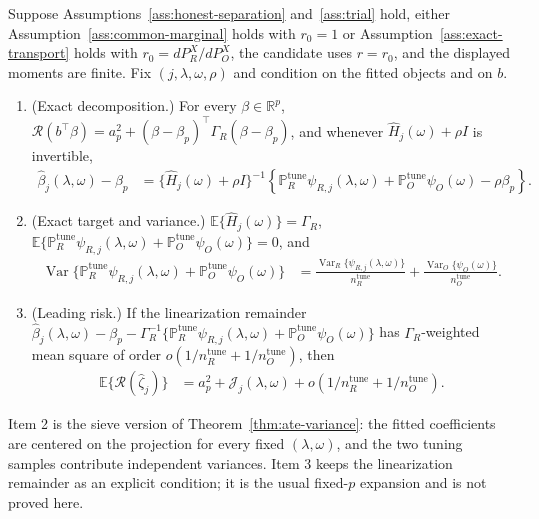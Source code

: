 \begin{theorem}
\label{thm:sieve-risk}
Suppose Assumptions~\ref{ass:honest-separation} and~\ref{ass:trial} hold, either Assumption~\ref{ass:common-marginal} holds with $r_0=1$ or Assumption~\ref{ass:exact-transport} holds with $r_0=dP_R^X/dP_O^X$, the candidate uses $r=r_0$, and the displayed moments are finite. Fix $(j,\lambda,\omega,\rho)$ and condition on the fitted objects and on $b$.
\begin{enumerate}
\item (Exact decomposition.) For every $\beta\in\mathbb R^p$, $\mathcal R(b^\top\beta)=a_p^2+(\beta-\beta_p)^\top\Gamma_R(\beta-\beta_p)$, and whenever $\widehat H_j(\omega)+\rho I$ is invertible,
\begin{align}
\widehat\beta_j(\lambda,\omega)-\beta_p
&=\{\widehat H_j(\omega)+\rho I\}^{-1}\left\{\mathbb P_R^{\mathrm{tune}}\psi_{R,j}(\lambda,\omega)+\mathbb P_O^{\mathrm{tune}}\psi_O(\omega)-\rho\beta_p\right\}.
\label{eq:sieve-coefficient-identity}
\end{align}
\item (Exact target and variance.) $\mathbb E\{\widehat H_j(\omega)\}=\Gamma_R$, $\mathbb E\{\mathbb P_R^{\mathrm{tune}}\psi_{R,j}(\lambda,\omega)+\mathbb P_O^{\mathrm{tune}}\psi_O(\omega)\}=0$, and
\begin{align}
\operatorname{Var}\{\mathbb P_R^{\mathrm{tune}}\psi_{R,j}(\lambda,\omega)+\mathbb P_O^{\mathrm{tune}}\psi_O(\omega)\}
&=\frac{\operatorname{Var}_R\{\psi_{R,j}(\lambda,\omega)\}}{n_R^{\mathrm{tune}}}+\frac{\operatorname{Var}_O\{\psi_O(\omega)\}}{n_O^{\mathrm{tune}}}.
\label{eq:sieve-score-variance}
\end{align}
\item (Leading risk.) If the linearization remainder $\widehat\beta_j(\lambda,\omega)-\beta_p-\Gamma_R^{-1}\{\mathbb P_R^{\mathrm{tune}}\psi_{R,j}(\lambda,\omega)+\mathbb P_O^{\mathrm{tune}}\psi_O(\omega)\}$ has $\Gamma_R$-weighted mean square of order $o(1/n_R^{\mathrm{tune}}+1/n_O^{\mathrm{tune}})$, then
\begin{align}
\mathbb E\{\mathcal R(\widehat\zeta_j)\}
&=a_p^2+\mathcal J_j(\lambda,\omega)+o(1/n_R^{\mathrm{tune}}+1/n_O^{\mathrm{tune}}).
\label{eq:sieve-leading-risk}
\end{align}
\end{enumerate}
\end{theorem}
Item 2 is the sieve version of Theorem~\ref{thm:ate-variance}: the fitted coefficients are centered on the projection for every fixed $(\lambda,\omega)$, and the two tuning samples contribute independent variances. Item 3 keeps the linearization remainder as an explicit condition; it is the usual fixed-$p$ expansion and is not proved here.

